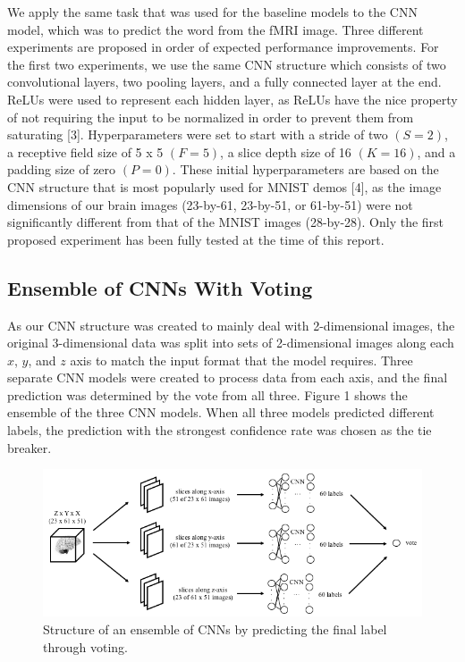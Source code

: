 \documentclass{article} %
\begin{document}
We apply the same task that was used for the baseline models to the CNN model, which was to predict the word from the fMRI image. Three different experiments are proposed in order of expected performance improvements. For the first two experiments, we use the same CNN structure which consists of two convolutional layers, two pooling layers, and a fully connected layer at the end. ReLUs were used to represent each hidden layer, as ReLUs have the nice property of not requiring the input to be normalized in order to prevent them from saturating [3]. Hyperparameters were set to start with a stride of two $(S=2)$, a receptive field size of 5 x 5 $(F=5)$, a slice depth size of 16 $(K=16)$, and a padding size of zero $(P=0)$. These initial hyperparameters are based on the CNN structure that is most popularly used for MNIST demos [4], as the image dimensions of our brain images (23-by-61, 23-by-51, or 61-by-51) were not significantly different from that of the MNIST images (28-by-28). Only the first proposed experiment has been fully tested at the time of this report.

\subsection{Ensemble of CNNs With Voting}

As our CNN structure was created to mainly deal with 2-dimensional images, the original 3-dimensional data was split into sets of 2-dimensional images along each $x$, $y$, and $z$ axis to match the input format that the model requires. Three separate CNN models were created to process data from each axis, and the final prediction was determined by the vote from all three. Figure 1 shows the ensemble of the three CNN models. When all three models predicted different labels, the prediction with the strongest confidence rate was chosen as the tie breaker.

\begin{figure}[h]
	\centering
	\includegraphics[height=0.26\textheight]{./img/cnn_proto_a.png}
	\caption{Structure of an ensemble of CNNs by predicting the final label through voting.}
\end{figure}
\end{document}
